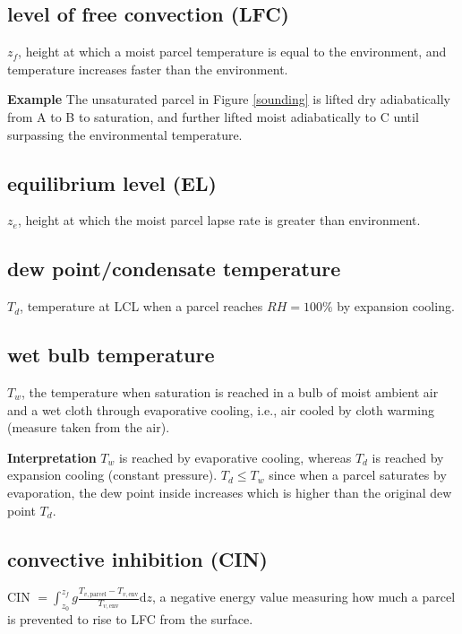 \subsection{level of free convection (LFC)}
\begin{defn*} $z_f$, height at which a moist parcel temperature is equal to the environment,
and temperature increases faster than the environment. 
\end{defn*}

{\bf Example} The unsaturated parcel in Figure {\ref{sounding}} is lifted dry adiabatically from A
to B to saturation, and further lifted moist adiabatically to C until surpassing the environmental
temperature.

\subsection{equilibrium level (EL)}
\begin{defn*} $z_e$, height at which the moist parcel lapse rate is greater than environment.
\end{defn*}

\subsection{dew point/condensate temperature}
\begin{defn*} $T_d$, temperature at LCL when a parcel reaches $RH=100\%$ by expansion cooling.
\end{defn*}

\subsection{wet bulb temperature}
\begin{defn*} $T_w$, the temperature when saturation is reached in a bulb of moist ambient air
and a wet cloth through evaporative cooling, i.e., air cooled by cloth warming (measure taken from
the air). 
\end{defn*}

{\bf Interpretation} $T_w$ is reached by evaporative cooling, whereas $T_d$ is
reached by expansion cooling (constant pressure). $T_d \le T_w$ since when a parcel saturates by
evaporation, the dew point inside increases which is higher than the original dew point $T_d$.

\subsection{convective inhibition (CIN)}
\begin{defn*} 
CIN $=\int_{z_0}^{z_f} g \frac{T_{v,\text{parcel}} - T_{v,\text{env}}}{T_{v,\text{env}}} $d$z$, 
a negative energy value measuring how much a parcel is prevented to rise to LFC from the surface. \\
\end{defn*}

